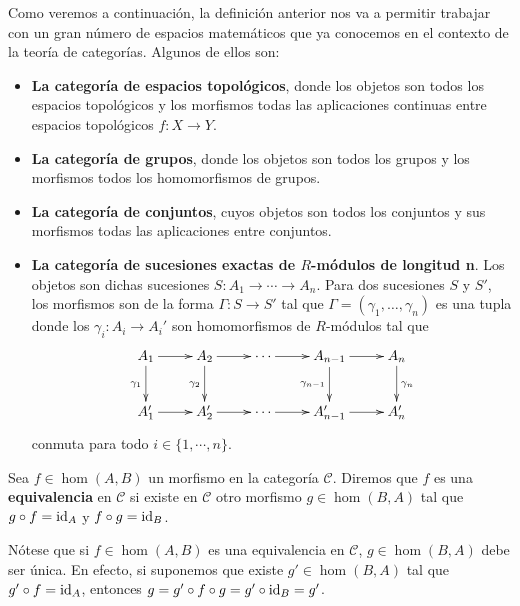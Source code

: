 \begin{ejemplo}
	Como veremos a continuación, la definición anterior nos va a permitir trabajar con un gran número de espacios matemáticos que ya conocemos en el contexto de la teoría de categorías. Algunos de ellos son:
	\begin{itemize}
		\item \textbf{La categoría de espacios topológicos}, donde los objetos son todos los espacios topológicos y los morfismos todas las aplicaciones continuas entre espacios topológicos $f: X \rightarrow Y$.
		\item \textbf{La categoría de grupos}, donde los objetos son todos los grupos y los morfismos todos los homomorfismos de grupos.
		\item \textbf{La categoría de conjuntos}, cuyos objetos son todos los conjuntos y sus morfismos todas las aplicaciones entre conjuntos.
		\item \textbf{La categoría de sucesiones exactas de $R$-módulos de longitud n}. Los objetos son dichas sucesiones $S: A_1 \rightarrow \cdots \rightarrow A_n$. Para dos sucesiones $S$ y $S'$, los morfismos son de la forma $\Gamma : S \rightarrow S'$ tal que $\Gamma = (\gamma_1, \dots, \gamma_n)$ es una tupla donde los $\gamma_i: A_i \rightarrow A_i'$ son homomorfismos de $R$-módulos tal que
		\begin{equation}
        \label{exactseqcat}
            \xymatrix{
            A_1 \ar[r] \ar[d]_{\gamma_1} & A_2 \ar[r] \ar[d]_{\gamma_2} & \cdots \ar[r] & A_{n-1} \ar[r] \ar[d]_{\gamma_{n-1}} & A_n \ar[d]^{\gamma_n} \\
            A'_1 \ar[r] & A'_2 \ar[r] & \cdots \ar[r] & A'_{n-1} \ar[r] & A'_n
            }
        \end{equation}
		conmuta para todo $i \in \{ 1, \cdots, n \}$.
	\end{itemize}
\end{ejemplo}

\begin{definicion}
	Sea $f \in \hom(A,B)$ un morfismo en la categoría $\mathcal{C}$. Diremos que $f$ es una \textbf{equivalencia} en $\mathcal{C}$ si existe en $\mathcal{C}$ otro morfismo $g \in \hom(B,A)$ tal que $g \circ f = \operatorname{id}_A$ y $f \circ g = \operatorname{id}_B$.
\end{definicion}

Nótese que si $f \in \hom(A,B)$ es una equivalencia en $\mathcal{C}$, $g \in \hom(B,A)$ debe ser única. En efecto, si suponemos que existe $g' \in \hom(B,A)$ tal que $g' \circ f = \operatorname{id}_A$, entonces $g = g'\circ f \circ g = g' \circ \operatorname{id}_B = g'$.

